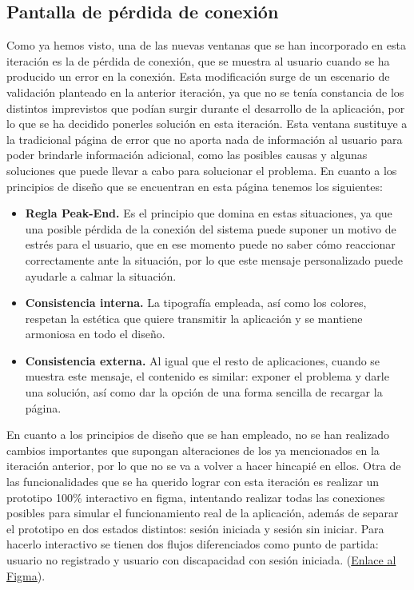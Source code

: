 \subsection*{Pantalla de pérdida de conexión}
Como ya hemos visto, una de las nuevas ventanas que se han incorporado en esta iteración es la de pérdida de conexión, que se muestra al usuario cuando se ha producido 
un error en la conexión. Esta modificación surge de un escenario de validación planteado en la anterior iteración, ya que no se tenía constancia de los distintos 
imprevistos que podían surgir durante el desarrollo de la aplicación, por lo que se ha decidido ponerles solución en esta iteración. Esta ventana sustituye a la 
tradicional página de error que no aporta nada de información al usuario para poder brindarle información adicional, como las posibles causas y algunas soluciones que 
puede llevar a cabo para solucionar el problema. En cuanto a los principios de diseño que se encuentran en esta página tenemos los siguientes:
\begin{itemize}
    \item \textbf{Regla Peak-End.} Es el principio que domina en estas situaciones, ya que una posible pérdida de la conexión del sistema puede suponer un motivo de 
    estrés para el usuario, que en ese momento puede no saber cómo reaccionar correctamente ante la situación, por lo que este mensaje personalizado puede ayudarle a 
    calmar la situación.
    \item \textbf{Consistencia interna.} La tipografía empleada, así como los colores, respetan la estética que quiere transmitir la aplicación y se mantiene armoniosa 
    en todo el diseño.
    \item \textbf{Consistencia externa.} Al igual que el resto de aplicaciones, cuando se muestra este mensaje, el contenido es similar: exponer el problema y darle 
    una solución, así como dar la opción de una forma sencilla de recargar la página.
\end{itemize}

En cuanto a los principios de diseño que se han empleado, no se han realizado cambios importantes que supongan alteraciones de los ya mencionados en la iteración anterior,
por lo que no se va a volver a hacer hincapié en ellos. Otra de las funcionalidades que se ha querido lograr con esta iteración es realizar un prototipo 100\% interactivo en figma, intentando realizar todas las conexiones
posibles para simular el funcionamiento real de la aplicación, además de separar el prototipo en dos estados distintos: sesión iniciada y sesión sin iniciar. Para hacerlo
interactivo se tienen dos flujos diferenciados como punto de partida: usuario no registrado y usuario con discapacidad con sesión iniciada. (\href{https://www.figma.com/file/YGz2UUMhvxNOTCHhu1TZle/Just-Travel-It?type=design&node-id=0%3A1&mode=design&t=18R6j8wE0vfjz3qF-1}{Enlace al Figma}).

